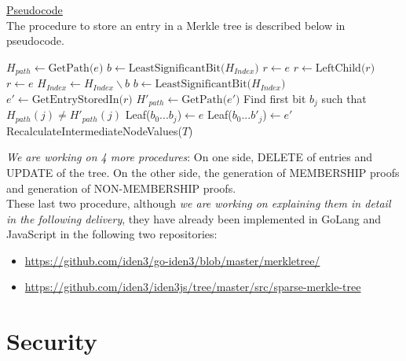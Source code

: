 \documentclass{article}
\begin{document}
\begin{spacing}{1.2}
\underline{Pseudocode}\\

The procedure to store an entry in a Merkle tree is described below in pseudocode. 

\begin{algorithm}
	\begin{algorithmic}[1]
		\State $H_{path} \gets \text{GetPath($e$)}$
		\State $b \gets \text{LeastSignificantBit($H_{Index}$)}$
		 $r \gets e$
		\Else
		 {$r \gets \text{LeftChild($r$)}$}
		\EndIf
		\State $r \gets e$
		\State $H_{Index} \gets H_{Index}\backslash{b}$
		\State $b \gets \text{LeastSignificantBit($H_{Index}$)}$
		\EndIf	
		\EndWhile
		\EndIf
		\State $e' \gets \text{GetEntryStoredIn($r$)}$
		\State $H'_{path} \gets \text{GetPath($e'$)}$
		\State Find first bit $b_j$ such that $H_{path}(j) \not= H'_{path}(j)$
		\State Leaf($b_0...b_j$)$\gets e$ %
		\State Leaf($b_0...b'_j$)$\gets e'$ %
		\State RecalculateIntermediateNodeValues($T$)	
		\EndIf
		\EndProcedure
	\end{algorithmic}
\end{algorithm}

\newpage
{\it We are working on 4 more procedures}: On one side, DELETE of entries and UPDATE of the tree. On the other side, the generation of MEMBERSHIP proofs and generation of NON-MEMBERSHIP proofs. \\

These last two procedure, although {\it we are working on explaining them in detail in the following delivery}, they have already been implemented in GoLang and JavaScript in the following two repositories:
\begin{itemize}
	\item \url{https://github.com/iden3/go-iden3/blob/master/merkletree/}
	\item \url{https://github.com/iden3/iden3js/tree/master/src/sparse-merkle-tree}
\end{itemize}


\section{Security} \label{sec-security}


\end{spacing}
\end{document}
